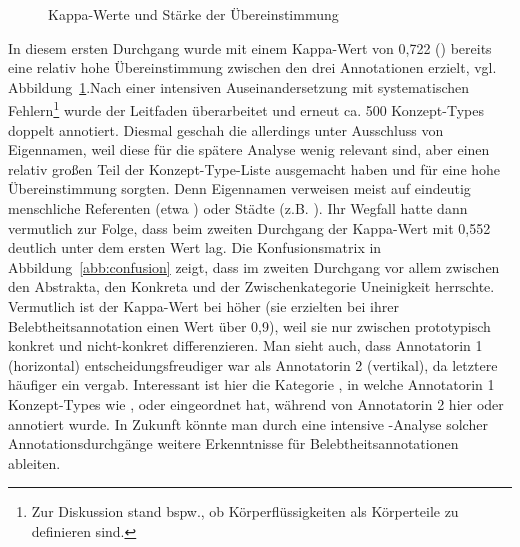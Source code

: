 \begin{figure}
\caption {Kappa-Werte und Stärke der Übereinstimmung \parencite[576]{Artstein2008}\label{abb:kappa-skala}}
\end{figure} 

In diesem ersten Durchgang wurde mit einem Kappa-Wert von 0,722 () bereits eine relativ hohe Übereinstimmung zwischen den drei Annotationen  erzielt, vgl. Abbildung~\ref{abb:kappa-skala}.\largerpage[1.25]
Nach einer intensiven Auseinandersetzung mit systematischen Fehlern\footnote{Zur Diskussion stand bspw., ob Körperflüssigkeiten als Körperteile zu definieren sind.} wurde der Leitfaden überarbeitet und erneut ca. 500 Konzept-Types  doppelt  annotiert. Diesmal geschah die  allerdings unter Ausschluss von  Eigennamen, weil diese für die spätere Analyse wenig relevant sind, aber einen relativ großen Teil der Konzept-Type-Liste  ausgemacht haben und für eine hohe Übereinstimmung sorgten. Denn Eigennamen  verweisen meist auf eindeutig menschliche Referenten (etwa ) oder Städte (z.B. ).
Ihr Wegfall hatte dann vermutlich zur Folge, dass beim zweiten Durchgang der Kappa-Wert mit 0,552 deutlich unter dem ersten Wert lag. 
Die Konfusionsmatrix in Abbildung~\ref{abb:confusion} zeigt, dass im zweiten Durchgang vor allem zwischen den  Abstrakta, den Konkreta  und der Zwischenkategorie  Uneinigkeit herrschte. Vermutlich ist der Kappa-Wert bei \textcite{Zaenen2004} höher (sie erzielten bei ihrer Belebtheitsannotation einen Wert über 0,9), weil sie nur zwischen prototypisch konkret  und nicht-konkret differenzieren. Man sieht auch, dass Annotatorin 1 (horizontal) entscheidungsfreudiger war als Annotatorin 2 (vertikal), da letztere häufiger ein  vergab. Interessant ist hier die Kategorie , in welche Annotatorin 1 Konzept-Types  wie ,  oder  eingeordnet hat, während von Annotatorin 2 hier  oder  annotiert wurde. In Zukunft könnte man durch eine intensive -Analyse solcher Annotationsdurchgänge  weitere Erkenntnisse für Belebtheitsannotationen   ableiten.  
 
